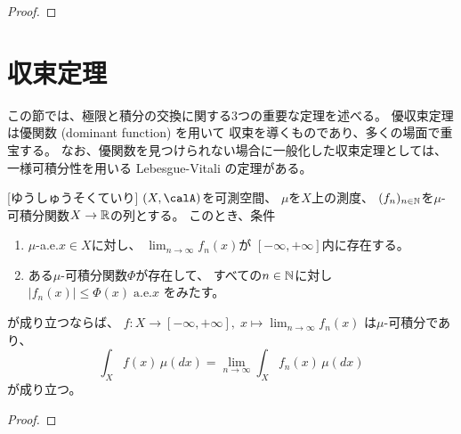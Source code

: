 \documentclass[report]{jlreq}
\begin{document}
\begin{corollary}
    \TODO{}
\end{corollary}

\begin{proof}
    \TODO{}
\end{proof}

%
\section{収束定理}

この節では、極限と積分の交換に関する3つの重要な定理を述べる。
優収束定理は優関数 (dominant function) を用いて
収束を導くものであり、多くの場面で重宝する。
なお、優関数を見つけられない場合に一般化した収束定理としては、
一様可積分性を用いる Lebesgue-Vitali の定理がある\cite[p.268]{Bog07}。

\begin{theorem}
    [ゆうしゅうそくていり]
    $(X, \calA)$を可測空間、
    $\mu$を$X$上の測度、
    $(f_n)_{n \in \mathbb{N}}$を$\mu$-可積分関数$X \to \mathbb{R}$の列とする。
    このとき、条件
    \begin{enumerate}
        \item $\mu$-a.e.$x \in X$に対し、
            $\lim_{n \to \infty} f_n(x)$が
            $[-\infty, +\infty]$内に存在する。
        \item ある$\mu$-可積分関数$\Phi$が存在して、
            すべての$n \in \mathbb{N}$に対し
            $|f_n(x)| \le \Phi(x) \; \text{a.e.$x$}$
            をみたす。
    \end{enumerate}
    が成り立つならば、
    $f \colon X \to [-\infty, +\infty], \;
        x \mapsto \lim_{n \to \infty} f_n(x)$
    は$\mu$-可積分であり、
    \begin{equation}
        \int_X f(x) \, \mu(dx)
            = \lim_{n \to \infty} \int_X f_n(x) \, \mu(dx)
    \end{equation}
    が成り立つ。
\end{theorem}

\begin{proof}
    \TODO{}
\end{proof}
\end{document}
